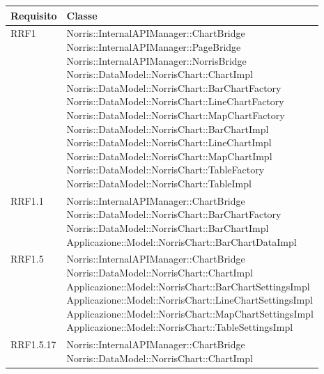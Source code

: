
				\begin{longtabu} spread 1cm [c]{|X[0.2]|X[0.8]|}
					\hline
					\rowfont{\bf \centering}
					Requisito &
					Classe \\
					\hline
					\endhead
					
					RRF1 & \parbox[t]{10cm}{ Norris::InternalAPIManager::ChartBridge \\ Norris::InternalAPIManager::PageBridge \\ Norris::InternalAPIManager::NorrisBridge \\ Norris::DataModel::NorrisChart::ChartImpl \\ Norris::DataModel::NorrisChart::BarChartFactory \\ Norris::DataModel::NorrisChart::LineChartFactory \\ Norris::DataModel::NorrisChart::MapChartFactory \\ Norris::DataModel::NorrisChart::BarChartImpl \\ Norris::DataModel::NorrisChart::LineChartImpl \\ Norris::DataModel::NorrisChart::MapChartImpl \\ Norris::DataModel::NorrisChart::TableFactory \\ Norris::DataModel::NorrisChart::TableImpl } \\ 
                \hline
                RRF1.1 & \parbox[t]{10cm}{ Norris::InternalAPIManager::ChartBridge \\ Norris::DataModel::NorrisChart::BarChartFactory \\ Norris::DataModel::NorrisChart::BarChartImpl \\ Applicazione::Model::NorrisChart::BarChartDataImpl } \\ 
                \hline
                RRF1.5 & \parbox[t]{10cm}{ Norris::InternalAPIManager::ChartBridge \\ Norris::DataModel::NorrisChart::ChartImpl \\ Applicazione::Model::NorrisChart::BarChartSettingsImpl \\ Applicazione::Model::NorrisChart::LineChartSettingsImpl \\ Applicazione::Model::NorrisChart::MapChartSettingsImpl \\ Applicazione::Model::NorrisChart::TableSettingsImpl } \\ 
                \hline
                RRF1.5.17 & \parbox[t]{10cm}{ Norris::InternalAPIManager::ChartBridge \\ Norris::DataModel::NorrisChart::ChartImpl } \\ 

\end{longtabu}
